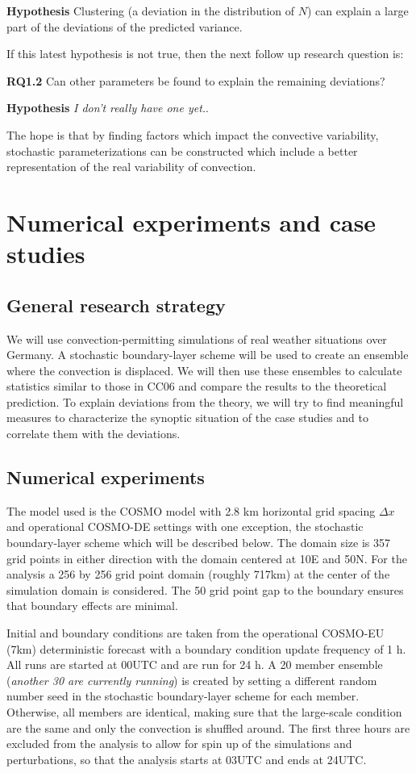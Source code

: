 \documentclass[a4paper, 12pt]{article}
\begin{document}
\textbf{Hypothesis} Clustering (a deviation in the distribution of $N$) can explain a large part of the deviations of the predicted variance.

If this latest hypothesis is not true, then the next follow up research question is:

\textbf{RQ1.2} Can other parameters be found to explain the remaining deviations?

\textbf{Hypothesis} \textit{I don't really have one yet.}.

The hope is that by finding factors which impact the convective variability, stochastic parameterizations can be constructed which include a better representation of the real variability of convection. 

\section{Numerical experiments and case studies}

\subsection{General research strategy}
We will use convection-permitting simulations of real weather situations over Germany. A stochastic boundary-layer scheme will be used to create an ensemble where the convection is displaced. We will then use these ensembles to calculate statistics similar to those in CC06 and compare the results to the theoretical prediction. To explain deviations from the theory, we will try to find meaningful measures to characterize the synoptic situation of the case studies and to correlate them with the deviations.  

\subsection{Numerical experiments}
The model used is the COSMO model with 2.8 km horizontal grid spacing $\Delta x$ and operational COSMO-DE settings with one exception, the stochastic boundary-layer scheme which will be described below. The domain size is 357 grid points in either direction with the domain centered at 10E and 50N. For the analysis a 256 by 256 grid point domain (roughly 717km) at the center of the simulation domain is considered. The 50 grid point gap to the boundary ensures that boundary effects are minimal. 

Initial and boundary conditions are taken from the operational COSMO-EU (7km) deterministic forecast with a boundary condition update frequency of 1 h. All runs are started at 00UTC and are run for 24 h. A 20 member ensemble (\textit{another 30 are currently running}) is created by setting a different random number seed in the stochastic boundary-layer scheme for each member. Otherwise, all members are identical, making sure that the large-scale condition are the same and only the convection is shuffled around. The first three hours are excluded from the analysis to allow for spin up of the simulations and perturbations, so that the analysis starts at 03UTC and ends at 24UTC.
\end{document}
